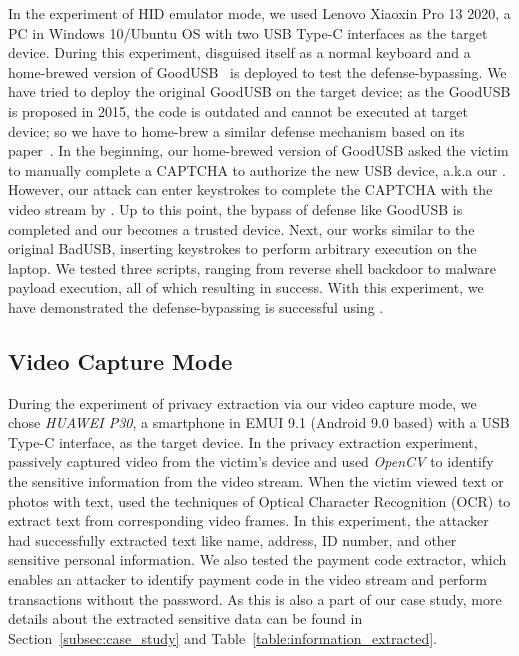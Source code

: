 In the experiment of HID emulator mode, we used {Lenovo Xiaoxin Pro 13
2020}, a PC in Windows 10/Ubuntu OS with two USB Type-C interfaces as the
target device.  During this experiment, \tool disguised itself as a normal
keyboard and a home-brewed version of GoodUSB~\cite{tian2015defending} is
deployed to test the defense-bypassing. We have tried to deploy the original
GoodUSB on the target device; as the GoodUSB is proposed in 2015, the code is
outdated and cannot be executed at target device; so we have to home-brew a similar
defense mechanism based on its paper~\cite{tian2015defending}.  In the
beginning, our home-brewed version of GoodUSB asked the victim to manually complete
a CAPTCHA to authorize the new USB device, a.k.a our \tool. 
However, our attack can enter keystrokes to complete the
CAPTCHA with the video stream by \tool. Up
to this point, the bypass of defense like GoodUSB is completed and our \tool
becomes a trusted device. Next, our
\tool works similar to the original BadUSB, inserting keystrokes to perform
arbitrary execution on the laptop. We tested three scripts, ranging from
reverse shell backdoor to malware payload execution, all of which resulting in
success. With this experiment, we have demonstrated the defense-bypassing is successful
using \tool.



\subsection{Video Capture Mode}

During the experiment of privacy extraction via our video capture mode, we chose \textit{HUAWEI P30}, a
smartphone in EMUI 9.1 (Android 9.0 based) with a USB Type-C interface, as the
target device.  In the privacy extraction experiment, \tool passively captured video
from the victim's device and used \textit{OpenCV} to identify the sensitive
information from the video stream.  When the victim viewed text or photos with
text, \tool used the techniques of Optical Character Recognition (OCR)  to
extract text from corresponding video frames. In this experiment, the attacker had
successfully extracted text like name, address, ID number, and other sensitive
personal information. We also tested the payment code extractor, which enables
an attacker to identify payment code in the video stream and perform transactions
without the password. As this is also a part of our case study, more details about
the extracted sensitive data can be found in Section~\ref{subsec:case_study} and
Table~\ref{table:information_extracted}.

